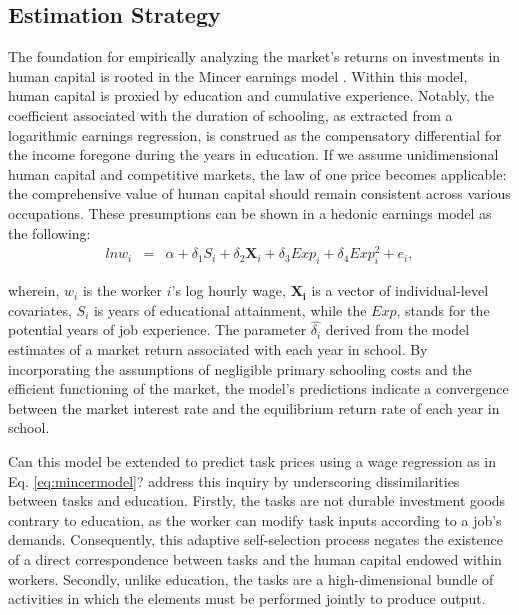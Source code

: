 \subsection{Estimation Strategy}

\setlength{\abovedisplayskip}{6pt} 

\setlength{\belowdisplayskip}{6pt}

\begin{onehalfspace}
The foundation for empirically analyzing the market's returns on investments
in human capital is rooted in the Mincer earnings model \citep{Mincer}.
Within this model, human capital is proxied by education and cumulative
experience. Notably, the coefficient associated with the duration
of schooling, as extracted from a logarithmic earnings regression,
is construed as the compensatory differential for the income foregone
during the years in education. If we assume unidimensional human capital
and competitive markets, the law of one price becomes applicable:
the comprehensive value of human capital should remain consistent
across various occupations. These presumptions can be shown in a hedonic
earnings model as the following:
\begin{eqnarray}
lnw_{i} & = & \alpha+\delta_{1}S_{i}+\delta_{2}\mathbf{X}_{i}+\delta_{3}Exp_{i}+\delta_{4}Exp_{i}^{2}+e_{i},\label{eq:mincermodel}
\end{eqnarray}

wherein, $w_{i}$ is the worker $i$'s log hourly wage, $\mathbf{X_{i}}$
is a vector of individual-level covariates, $S_{i}$ is years of educational
attainment, while the $Exp$, stands for the potential years of job
experience. The parameter $\hat{\delta_{i}}$ derived from the model
estimates of a market return associated with each year in school.
By incorporating the assumptions of negligible primary schooling costs
and the efficient functioning of the market, the model's predictions
indicate a convergence between the market interest rate and the equilibrium
return rate of each year in school. 

Can this model be extended to predict task prices using a wage regression
as in Eq. \ref{eq:mincermodel}? \citet{2013Autora} address this
inquiry by underscoring dissimilarities between tasks and education.
Firstly, the tasks are not durable investment goods contrary to education,
as the worker can modify task inputs according to a job's demands.
Consequently, this adaptive self-selection process negates the existence
of a direct correspondence between tasks and the human capital endowed
within workers. Secondly, unlike education, the tasks are a high-dimensional
bundle of activities in which the elements must be performed jointly
to produce output. 


\end{onehalfspace}
